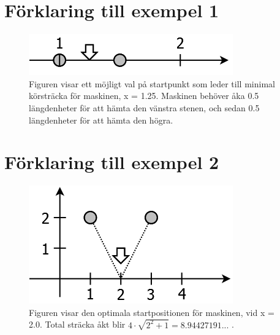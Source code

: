 \section*{Förklaring till exempel 1}

\begin{figure}[!h]
\begin{center}
\includegraphics[scale=0.4]{stenar1.png}
\end{center}
\caption{Figuren visar ett möjligt val på startpunkt som leder till minimal körsträcka för maskinen, x = 1.25. Maskinen behöver åka 0.5 längdenheter för att hämta den vänstra stenen, och sedan 0.5 längdenheter för att hämta den högra.}
\label{fig1}
\end{figure}

\section*{Förklaring till exempel 2}
\begin{figure}[!h]
\begin{center}
\includegraphics[scale=0.4]{stenar2.png}
\end{center}
\caption{Figuren visar den optimala startpositionen för maskinen, vid x = 2.0. Total sträcka åkt blir $4\cdot\sqrt{2^2 + 1} = 8.94427191...$ .}
\label{fig1}
\end{figure}
